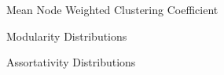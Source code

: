 \documentclass[dvipsnames]{beamer}
\begin{document}
\begin{frame}[fragile]{Mean Node Weighted Clustering Coefficient}
\begin{figure}[htb!]
\end{figure}
\end{frame}
\begin{frame}[fragile]{Modularity Distributions}
    \begin{figure}[htb!]
    \end{figure}
\end{frame}
\begin{frame}[fragile]{Assortativity Distributions}
    \begin{figure}[htb!]
    \end{figure}
\end{frame}
\end{document}
